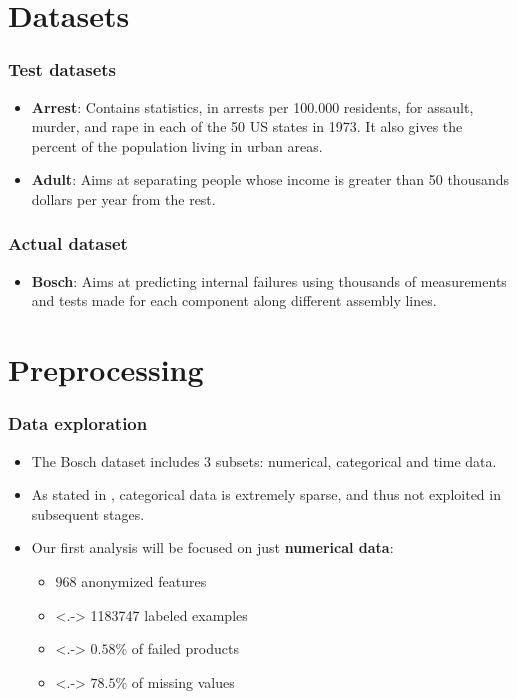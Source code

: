 \documentclass{beamer}
\begin{document}
\section{Datasets}
\begin{frame}
  \frametitle{Test datasets}
  \begin{itemize}[<+->]
    \item \textbf{Arrest}: Contains statistics, in arrests per 100.000 residents, for assault, murder, and rape in each of the 50 US states in 1973. 
          It also gives the percent of the population living in urban areas.
    \item \textbf{Adult}: Aims at separating people whose income is greater than 50 thousands dollars per year from the rest.
  \end{itemize}	
\end{frame}

\begin{frame}
  \frametitle{Actual dataset}
  \begin{itemize}[<+->]
    \item \textbf{Bosch}: Aims at predicting internal failures using thousands of measurements and tests made for each component along different assembly lines.
  \end{itemize}
\end{frame}

\section{Preprocessing}
\begin{frame}
  \frametitle{Data exploration}
  \begin{itemize}[<+->]
    \item The Bosch dataset includes 3 subsets: numerical, categorical and time data.
    \item As stated in \cite{predict-failures}, categorical data is extremely sparse, and thus not exploited in subsequent stages.
    \item Our first analysis will be focused on just \textbf{numerical data}:
    \begin{itemize} 
      \item $968$ anonymized features
      \item<.-> \num{1183747} labeled examples
      \item<.-> $0.58\%$ of failed products
      \item<.-> $78.5\%$ of missing values
    \end{itemize}
  \end{itemize}
\end{frame}
\end{document}
